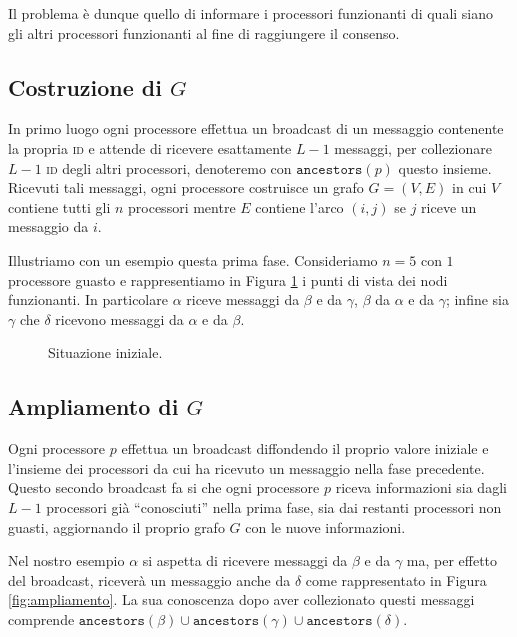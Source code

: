 \documentclass{article}
\begin{document}
Il problema è dunque quello di informare i processori funzionanti di
quali siano gli altri processori funzionanti al fine di raggiungere il
consenso.

\subsection{Costruzione di $G$}
In primo luogo ogni processore effettua un broadcast di un messaggio
contenente la propria \textsc{id} e attende di ricevere esattamente
$L-1$ messaggi, per collezionare $L-1$ \textsc{id} degli altri
processori, denoteremo con $\texttt{ancestors}(p)$ questo
insieme. Ricevuti tali messaggi, ogni processore costruisce un grafo
$G=(V,E)$ in cui $V$ contiene tutti gli $n$ processori mentre $E$
contiene l'arco $(i,j)$ se $j$ riceve un messaggio da $i$.

Illustriamo con un esempio questa prima fase. Consideriamo $n=5$ con
$1$ processore guasto e rappresentiamo in Figura \ref{fig:povIniziali}
i punti di vista dei nodi funzionanti. In particolare $\alpha$ riceve
messaggi da $\beta$ e da $\gamma$, $\beta$ da $\alpha$ e da $\gamma$;
infine sia $\gamma$ che $\delta$ ricevono messaggi da $\alpha$ e da
$\beta$.

\begin{figure}[!h]
  \centering \caption{Situazione iniziale.}\label{fig:povIniziali}
\end{figure}


\subsection{Ampliamento di $G$}
Ogni processore $p$ effettua un broadcast diffondendo il proprio
valore iniziale e l'insieme dei processori da cui ha ricevuto un
messaggio nella fase precedente. Questo secondo broadcast fa si che
ogni processore $p$ riceva informazioni sia dagli $L-1$ processori già
``conosciuti'' nella prima fase, sia dai restanti processori non
guasti, aggiornando il proprio grafo $G$ con le nuove informazioni.



Nel nostro esempio $\alpha$ si aspetta di ricevere messaggi da $\beta$
e da $\gamma$ ma, per effetto del broadcast, riceverà un messaggio
anche da $\delta$ come rappresentato in Figura
\ref{fig:ampliamento}. La sua conoscenza dopo aver collezionato questi
messaggi comprende
$\texttt{ancestors}(\beta)\cup\texttt{ancestors}(\gamma)\cup\texttt{ancestors}(\delta)$.
\end{document}
